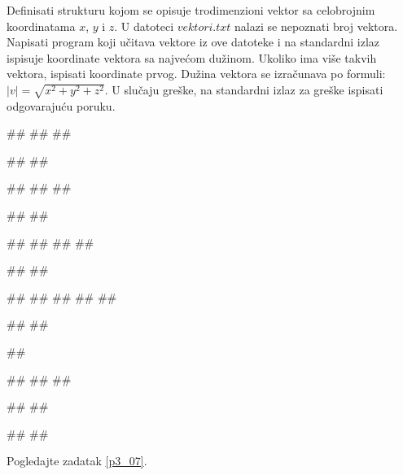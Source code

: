 \begin{Exercise}[label=p3_x5]         
Definisati strukturu kojom se opisuje trodimenzioni vektor sa celobrojnim koordinatama $x$, $y$ i $z$.
U datoteci $vektori.txt$ nalazi se nepoznati broj vektora. 
Napisati program koji učitava vektore iz ove datoteke i na standardni izlaz ispisuje 
koordinate vektora sa najvećom dužinom. Ukoliko ima više takvih vektora, ispisati koordinate prvog.
Dužina vektora se izračunava po formuli: $|v|= \sqrt{x^2+y^2+z^2}$.
U slučaju greške, na standardni izlaz za greške ispisati odgovarajuću poruku.

\begin{minitest}
\begin{upotreba}{1}
##
##
##

#\naslovIzlaz#
##
\end{upotreba}
\end{minitest}
\begin{minitest}
\begin{upotreba}{2}
##
##
##

#\naslovIzlaz#
##
\end{upotreba}
\end{minitest}
\begin{minitest}
\begin{upotreba}{3}
##
##
##
##

#\naslovIzlaz#
##
\end{upotreba}
\end{minitest}

\begin{minitest}
\begin{upotreba}{4}
##
##
##
##
##

#\naslovIzlaz#
##
\end{upotreba}
\end{minitest}
\begin{minitest}
\begin{upotreba}{5}
##

#\naslovIzlazZaGresku#
##
##
\end{upotreba}
\end{minitest}
\begin{minitest}
\begin{upotreba}{6}
##
##

#\naslovIzlaz#
##
\end{upotreba}
\end{minitest}
\end{Exercise}
\begin{Answer}[ref=p3_x5]
Pogledajte zadatak \ref{p3_07}.
\end{Answer}


